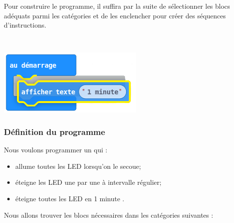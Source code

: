 \newpage

\begin{minipage}[t]{0.75\linewidth}
Pour construire le programme, il suffira par la suite de sélectionner les blocs adéquats parmi les catégories et de les enclencher pour créer des séquences d'instructions.
\end{minipage}
\hfill
\begin{minipage}[t]{0.25\linewidth}~\\
  \vspace{-2mm}
  \begin{center}
    \includegraphics[scale=0.4]{res/mb-makecode_1erProg_enclencher2.png}
  \end{center}
\end{minipage}

\subsubsection{Définition du programme}

Nous voulons programmer un \mb qui :

\begin{itemize}

  \item allume toutes les LED lorsqu'on le secoue;
  \item éteigne les LED une par une à intervalle régulier;
  \item éteigne toutes les LED en 1 minute \mb.

\end{itemize}

Nous allons trouver les blocs nécessaires dans les catégories suivantes :

